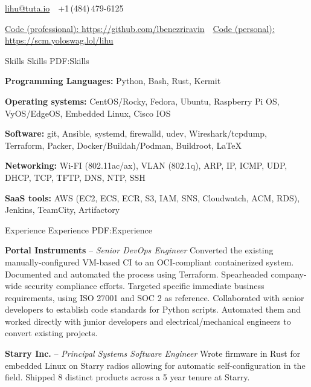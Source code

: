 \documentclass[letterpaper,MMMyyyy,nonstopmode]{simpleresumecv}
\newcommand{\CVAuthor}{Lihu Ben-Ezri-Ravin}
\begin{document}
\Title{\CVAuthor}

\begin{SubTitle}
\href{mailto:lihu@tuta.io}
{lihu@tuta.io}
\,\SubBulletSymbol\,
+1\,(484)\,479-6125
\par
\href{https://github.com/lbenezriravin}
{Code (professional): \url{https://github.com/lbenezriravin}}
\,\SubBulletSymbol\,
\href{https://scm.yoloswag.lol/lihu}
{Code (personal): \url{https://scm.yoloswag.lol/lihu}}
\end{SubTitle}

\begin{Body}

\Section
{Skills}
{Skills}
{PDF:Skills}
{\raggedright

\Entry
\textbf{Programming Languages: }
Python,
Bash,
Rust,
Kermit

\Entry
\textbf{Operating systems:}
CentOS/Rocky,
Fedora,
Ubuntu,
Raspberry Pi OS,
VyOS/EdgeOS,
Embedded Linux,
Cisco IOS

\Entry
\textbf{Software: }
git,
Ansible,
systemd,
firewalld,
udev,
Wireshark/tcpdump,
Terraform,
Packer,
Docker/Buildah/Podman,
Buildroot,
{\LaTeX}

\Entry
\textbf{Networking: }
Wi-FI (802.11ac/ax),
VLAN (802.1q),
ARP,
IP,
ICMP,
UDP,
DHCP,
TCP,
TFTP,
DNS,
NTP,
SSH

\Entry
\textbf{SaaS tools: }
AWS (EC2, ECS, ECR, S3, IAM, SNS, Cloudwatch, ACM, RDS),
Jenkins,
TeamCity,
Artifactory


}

\Section
{Experience}
{Experience}
{PDF:Experience}

\Entry
\textbf{Portal Instruments}
\hfill
{} --
\Gap
\textit{Senior DevOps Engineer}
\Gap
\BulletItem
Converted the existing manually-configured VM-based CI to an OCI-compliant
containerized system. Documented and automated the process using Terraform.
\BulletItem
Spearheaded company-wide security compliance efforts. Targeted specific
immediate business requirements, using ISO 27001 and SOC 2 as reference.
\BulletItem
Collaborated with senior developers to establish code standards for
Python scripts. Automated them and worked directly with junior developers and
electrical/mechanical engineers to convert existing projects.

\BigGap

\Entry
\textbf{Starry Inc.}
\hfill
{} --
\Gap
\textit{Principal Systems Software Engineer}
\Gap
\BulletItem
Wrote firmware in Rust for embedded Linux on Starry radios allowing for
automatic self-configuration in the field.
\BulletItem
Shipped 8 distinct products across a 5 year tenure at Starry.


\end{Body}
\end{document}
